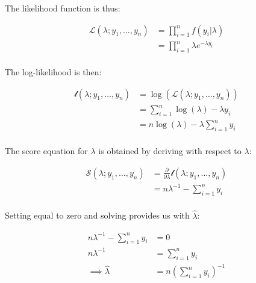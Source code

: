 \documentclass{report}
\begin{document}
The likelihood function is thus:

\begin{equation}\label{eq:ex-glm-mle-exponential-likelihood}
    \begin{aligned}
        \mathcal{L}(\lambda;y_1, \dots, y_n) 
          &= \prod_{i=1}^n f(y_i|\lambda) \\
          &= \prod_{i=1}^n \lambda e^{-\lambda y_i} \\
    \end{aligned}
\end{equation}

The log-likelihood is then:

\begin{equation}\label{eq:ex-glm-mle-exponential-loglik}
    \begin{aligned}
        \mathcal{l}(\lambda;y_1, \dots, y_n) 
          &= \log\left(\mathcal{L}(\lambda;y_1, \dots, y_n)\right) \\
          &= \sum_{i=1}^n \log(\lambda) - \lambda y_i \\
          &= n\log(\lambda) - \lambda\sum_{i=1}^n y_i \\
    \end{aligned}
\end{equation}

The score equation for $\lambda$ is obtained by deriving with respect to $\lambda$:

\begin{equation}\label{eq:ex-glm-mle-exponential-score-equation}
    \begin{aligned}
        \mathcal{S}(\lambda; y_1, \dots, y_n)
          &= \frac{\partial}{\partial\lambda} \mathcal{l}(\lambda;y_1, \dots, y_n) \\
          &= n\lambda^{-1} - \sum_{i=1}^n y_i \\
    \end{aligned}
\end{equation}

Setting equal to zero and solving provides us with $\hat{\lambda}$:

\begin{equation}\label{eq:ex-glm-mle-exponential-lambda-mle}
    \begin{aligned}
        n\lambda^{-1} - \sum_{i=1}^n y_i &= 0 \\
        n\lambda^{-1} &= \sum_{i=1}^n y_i \\
        \implies \hat{\lambda} &= n\left(\sum_{i=1}^n y_i\right)^{-1} \\
    \end{aligned}
\end{equation}
\end{document}
